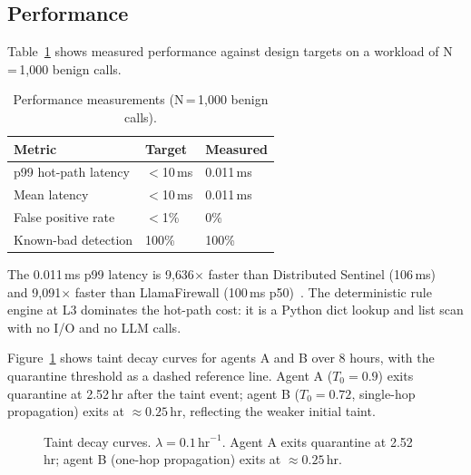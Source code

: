 \documentclass[conference]{IEEEtran}
\begin{document}
\subsection{Performance}

Table~\ref{tab:perf} shows measured performance against design targets on
a workload of N\,=\,1{,}000 benign calls.

\begin{table}[t]
\centering
\caption{Performance measurements (N\,=\,1{,}000 benign calls).}
\label{tab:perf}
\begin{tabular}{lll}
\toprule
Metric & Target & Measured \\
\midrule
p99 hot-path latency  & $<$10\,ms & 0.011\,ms \\
Mean latency          & $<$10\,ms & 0.011\,ms \\
False positive rate   & $<$1\%    & 0\%       \\
Known-bad detection   & 100\%     & 100\%     \\
\bottomrule
\end{tabular}
\end{table}

The 0.011\,ms p99 latency is 9{,}636$\times$ faster than Distributed
Sentinel (106\,ms)~\cite{sentinel2026} and 9{,}091$\times$ faster than
LlamaFirewall (100\,ms p50)~\cite{llamafirewall2025}. The deterministic
rule engine at L3 dominates the hot-path cost: it is a Python dict lookup
and list scan with no I/O and no LLM calls.

Figure~\ref{fig:decay} shows taint decay curves for agents A and B over
8 hours, with the quarantine threshold as a dashed reference line. Agent
A ($T_0 = 0.9$) exits quarantine at 2.52\,hr after the taint event;
agent B ($T_0 = 0.72$, single-hop propagation) exits at
${\approx}0.25\,\text{hr}$, reflecting the weaker initial taint.

\begin{figure}[t]
\centering
{}
\caption{Taint decay curves. $\lambda = 0.1\,\text{hr}^{-1}$. Agent A
exits quarantine at 2.52\,hr; agent B (one-hop propagation) exits at
${\approx}0.25\,\text{hr}$.}
\label{fig:decay}
\end{figure}
\end{document}
